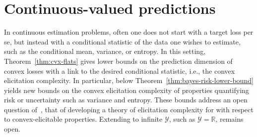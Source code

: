 \documentclass{article}
\newcommand{\Comments}{1}
\newcommand{\mytodo}[2]{\ifnum\Comments=1%
	\todo[linecolor=#1!80!black,backgroundcolor=#1,bordercolor=#1!80!black]{#2}\fi}
\newcommand{\jessiet}[1]{\mytodo{purple!20!white}{JF: #1}}
\newcommand{\reals}{\mathbb{R}}
\newcommand{\simplex}{\Delta_\Y}
\newcommand{\R}{\mathcal{R}}
\newcommand{\Y}{\mathcal{Y}}
\newcommand{\iden}{\mathrm{iden}}
\newcommand{\ones}{\mathbbm{1}}
\newtheorem{definition}{Definition}
\begin{document}
\section{Continuous-valued predictions}\label{sec:contin-consis}

In continuous estimation problems, often one does not start with a target loss per se, but instead with a conditional statistic of the data one wishes to estimate, such as the conditional mean, variance, or entropy.
In this setting, Theorem~\ref{thm:cvx-flats} gives lower bounds on the prediction dimension of convex losses with a link to the desired conditional statistic, i.e., the convex elicitation complexity.
In particular,
below Theorem~\ref{thm:bayes-risk-lower-bound} yields new bounds on the convex elicitation complexity of properties quantifying risk or uncertainty such as variance and entropy.
These bounds address an open question of~\citet{frongillo2018elicitation}, that of developing a theory of elicitation complexity for with respect to convex-elicitable properties.
Extending to infinite $\Y$, such as $\Y=\reals$, remains open.




\end{document}
